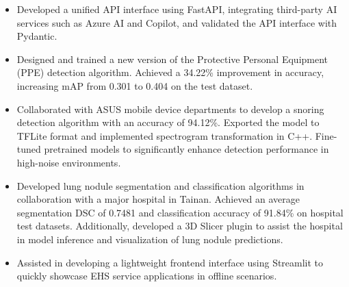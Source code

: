 \begin{cventries}
{\begin{cvitems}
          \begin{itemize}
              \item Developed a unified API interface using FastAPI, integrating third-party AI services such as Azure AI and Copilot, 
              and validated the API interface with Pydantic.
          \end{itemize}
          \begin{itemize}
              \item Designed and trained a new version of the Protective Personal Equipment (PPE) detection algorithm. 
              Achieved a 34.22\% improvement in accuracy, increasing mAP from 0.301 to 0.404 on the test dataset.
          \end{itemize}
          \begin{itemize}
              \item Collaborated with ASUS mobile device departments to develop a snoring detection algorithm with an accuracy of 94.12\%. 
              Exported the model to TFLite format and implemented spectrogram transformation in C++. 
              Fine-tuned pretrained models to significantly enhance detection performance in high-noise environments.
          \end{itemize}
          \begin{itemize}
              \item Developed lung nodule segmentation and classification algorithms in collaboration with a major hospital in Tainan. Achieved an average segmentation DSC of 0.7481 and classification accuracy of 91.84\% on hospital test datasets. 
              Additionally, developed a 3D Slicer plugin to assist the hospital in model inference and visualization of lung nodule predictions.
          \end{itemize}
          \begin{itemize}
              \item Assisted in developing a lightweight frontend interface using Streamlit to quickly showcase EHS service applications in offline scenarios.
          \end{itemize}
        \end{cvitems}
    }
  

\end{cventries}
